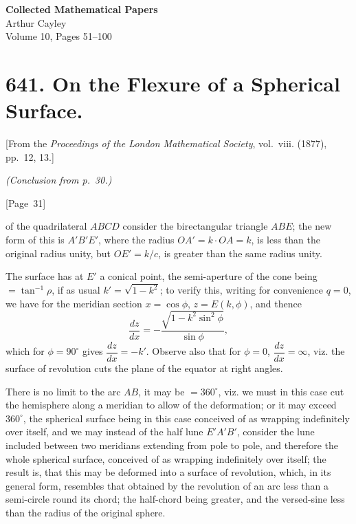 \documentclass[11pt,a4paper]{article}
\theoremstyle{plain}
\theoremstyle{definition}
\theoremstyle{remark}
\begin{document}
\begin{center}
{\LARGE\bfseries Collected Mathematical Papers}\\[1em]
{\Large Arthur Cayley}\\[1em]
{\large Volume 10, Pages 51--100}
\end{center}

\vspace{2em}

\tableofcontents

\newpage
\section*{641. On the Flexure of a Spherical Surface.}

[From the \textit{Proceedings of the London Mathematical Society}, vol.~viii. (1877),
pp.~12, 13.]

\textit{(Conclusion from p.~30.)}

\begin{center}
[Page~31]
\end{center}

of the quadrilateral $ABCD$ consider the birectangular triangle $ABE$;
the new form of this is $A'B'E'$, where the radius $OA' = k \cdot OA = k$,
is less than the original radius unity, but $OE' = k/c$, is greater than
the same radius unity.

The surface has at $E'$ a conical point, the semi-aperture of the cone
being $= \tan^{-1} \rho$, if as usual $k' = \sqrt{1-k^2}$;
to verify this, writing for convenience $q=0$, we have for the meridian
section $x = \cos\phi$, $z = E(k,\phi)$, and thence
\[
\frac{dz}{dx} = -\frac{\sqrt{1-k^2\sin^2\phi}}{\sin\phi},
\]
which for $\phi = 90^\circ$ gives $\dfrac{dz}{dx} = -k'$.
Observe also that for $\phi = 0$, $\dfrac{dz}{dx} = \infty$,
viz. the surface of revolution cuts the plane of the equator at right angles.

There is no limit to the arc $AB$, it may be $= 360^\circ$,
viz. we must in this case cut the hemisphere along a meridian to allow of
the deformation; or it may exceed $360^\circ$, the spherical surface being in
this case conceived of as wrapping indefinitely over itself, and we may
instead of the half lune $E'A'B'$, consider the lune included between
two meridians extending from pole to pole, and therefore the whole
spherical surface, conceived of as wrapping indefinitely over itself;
the result is, that this may be deformed into a surface of revolution,
which, in its general form, resembles that obtained by the revolution of
an arc less than a semi-circle round its chord; the half-chord being
greater, and the versed-sine less than the radius of the original sphere.
\end{document}
